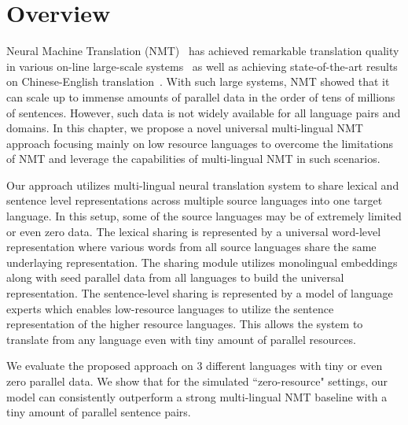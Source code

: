 \section{Overview}
Neural Machine Translation (NMT)~\cite{bahdanau2014neural} has achieved remarkable  translation quality in various  on-line large-scale systems~\cite{wu2016google,devlin:2017:EMNLP2017} as well as achieving  state-of-the-art results on Chinese-English  translation~\cite{hassan-hp}. With such large systems, NMT showed that it can scale up to immense  amounts of parallel data in the order of tens of millions of sentences. However, such data is not widely available for all language pairs and  domains. In this chapter, we propose a novel universal multi-lingual NMT approach  focusing mainly on low resource languages to overcome the  limitations of NMT and leverage the capabilities of multi-lingual NMT  in such scenarios.

Our approach utilizes multi-lingual neural translation system to share lexical and sentence level representations across multiple source languages into one target language. In this setup, some of the source languages may be of extremely limited  or even zero data.  The lexical sharing is represented by a  universal word-level representation where various words from all source languages  share the same underlaying representation. The sharing module utilizes monolingual embeddings along with seed parallel data from all languages to build the universal representation. The sentence-level sharing is represented by a model of language experts which  enables low-resource  languages to  utilize the sentence representation of the higher resource languages.  This allows the system to translate from any language even with tiny amount of parallel resources.  %

We evaluate the proposed approach on 3 different  languages with tiny or even zero parallel data.
We show that for the simulated ``zero-resource" settings, our model can consistently outperform a strong multi-lingual NMT baseline with a tiny amount of parallel sentence pairs.


